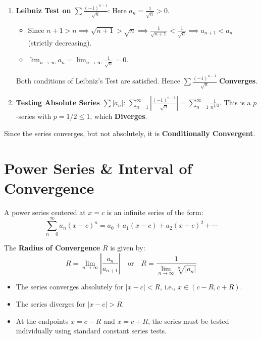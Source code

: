 \begin{solutionbox}
\begin{enumerate}
    \item \textbf{Leibniz Test on $\sum \frac{(-1)^{n-1}}{\sqrt{n}}$}:
    Here $a_n = \frac{1}{\sqrt{n}} > 0$.
    \begin{itemize}
        \item Since $n+1 > n \implies \sqrt{n+1} > \sqrt{n} \implies \frac{1}{\sqrt{n+1}} < \frac{1}{\sqrt{n}} \implies a_{n+1} < a_n$ (strictly decreasing).
        \item $\lim_{n\to\infty} a_n = \lim_{n\to\infty} \frac{1}{\sqrt{n}} = 0$.
    \end{itemize}
    Both conditions of Leibniz's Test are satisfied. Hence $\sum \frac{(-1)^{n-1}}{\sqrt{n}}$ \textbf{Converges}.

    \item \textbf{Testing Absolute Series $\sum |a_n|$}:
    $\sum_{n=1}^\infty \left| \frac{(-1)^{n-1}}{\sqrt{n}} \right| = \sum_{n=1}^\infty \frac{1}{n^{1/2}}$.
    This is a $p$-series with $p = 1/2 \le 1$, which \textbf{Diverges}.
\end{enumerate}
Since the series converges, but not absolutely, it is \textbf{Conditionally Convergent}.
\end{solutionbox}

\section{Power Series \& Interval of Convergence}

\begin{definition}
A power series centered at $x = c$ is an infinite series of the form:
\begin{equation}
    \sum_{n=0}^\infty a_n (x - c)^n = a_0 + a_1(x-c) + a_2(x-c)^2 + \cdots
\end{equation}
\end{definition}

\begin{theorem}
The \textbf{Radius of Convergence} $R$ is given by:
\begin{equation}
    R = \lim_{n\to\infty} \left| \frac{a_n}{a_{n+1}} \right| \quad \text{or} \quad R = \frac{1}{\lim_{n\to\infty} \sqrt[n]{|a_n|}}
\end{equation}
\begin{itemize}[leftmargin=1.5em]
    \item The series converges absolutely for $|x - c| < R$, i.e., $x \in (c - R, c + R)$.
    \item The series diverges for $|x - c| > R$.
    \item At the endpoints $x = c - R$ and $x = c + R$, the series must be tested individually using standard constant series tests.
\end{itemize}
\end{theorem}

